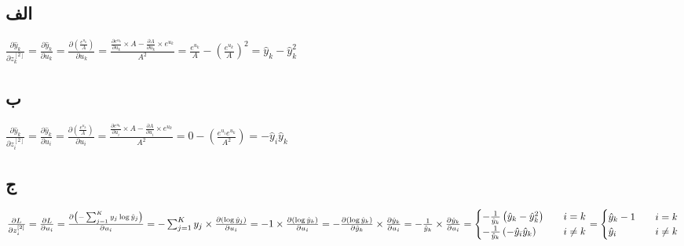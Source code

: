 \documentclass{article}
\begin{document}
\subsection{الف}
\begin{latin}
$
\frac{\partial \hat{y}_k}{\partial z^{[2]}_k}
= \frac{\partial \hat{y}_k}{\partial u_k}
= \frac{\partial \left( \frac{e ^ {u_k}}{A} \right)}{\partial u_k}
= \frac{\frac{\partial e ^ {u_k}}{\partial u_k} \times A  - \frac{\partial A}{\partial u_k} \times e ^ {u_k}}{A ^ 2}
= \frac{e ^ {u_k}}{A} - \left( \frac{e ^ {u_k}}{A} \right) ^ {2}
= \hat{y}_k - \hat{y} ^ 2_k 
$
\end{latin}

\subsection{ب}
\begin{latin}
$
\frac{\partial \hat{y}_k}{\partial z^{[2]}_i}
= \frac{\partial \hat{y}_k}{\partial u_i}
= \frac{\partial \left( \frac{e ^ {u_k}}{A} \right)}{\partial u_i}
= \frac{\frac{\partial e ^ {u_k}}{\partial u_i} \times A  - \frac{\partial A}{\partial u_i} \times e ^ {u_k}}{A ^ 2}
= 0 - \left( \frac{e ^ {u_i} e ^ {u_k}}{A ^ {2}} \right)
= - \hat{y}_i \hat{y}_k
$
\end{latin}
\subsection{ج}
\begin{latin}
$
\frac{\partial L}{\partial z^{[2]}_i}
= \frac{\partial L}{\partial u_i}
= \frac{\partial \left( -\sum_{j = 1}^{K} y_j \log \hat{y}_j \right)}{\partial u_i}
= -\sum_{j = 1}^{K} y_j \times \frac{\partial \left( \log \hat{y}_j \right)}{\partial u_i}
= - 1 \times \frac{\partial \left( \log \hat{y}_k \right)}{\partial u_i}
= - \frac{\partial \left( \log \hat{y}_k \right)}{\partial \hat{y}_k} \times \frac{\partial \hat{y}_k}{\partial u_i}
= - \frac{1}{\hat{y}_k} \times \frac{\partial \hat{y}_k}{\partial u_i}
\\
= 
     \begin{cases}
       - \frac{1}{\hat{y}_k} \left( \hat{y}_k - \hat{y} ^ 2_k \right) &\quad i = k \\
       - \frac{1}{\hat{y}_k} \left( - \hat{y}_i \hat{y}_k \right) &\quad i \neq k \\
     \end{cases}
=
     \begin{cases}
       \hat{y}_k - 1 &\quad i = k \\
       \hat{y}_i &\quad i \neq k \\
     \end{cases}
$
\end{latin}
\end{document}

